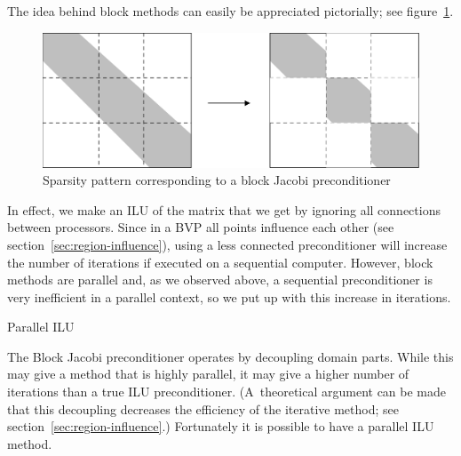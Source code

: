 The idea behind block methods can easily be appreciated pictorially;
see figure~\ref{fig:block-method}.
\begin{figure}[ht]
  \includegraphics[scale=.12]{graphics/block-jacobi}
  \caption{Sparsity pattern corresponding to a block Jacobi
    preconditioner}
  \label{fig:block-method}
\end{figure}
In effect, we make an \ac{ILU} of the matrix that we get by ignoring
all connections between processors. Since in a \ac{BVP} all points
influence each other (see section~\ref{sec:region-influence}), using a
less connected preconditioner will increase the number of iterations
if executed on a sequential computer. However, block methods are
parallel and, as we observed above, a sequential preconditioner is
very inefficient in a parallel context, so we put up with this
increase in iterations.


 {Parallel ILU}
\label{sec:parallel-ilu}

The Block Jacobi preconditioner operates by decoupling domain
parts. While this may give a method that is highly parallel, it may
give a higher number of iterations than a true \ac{ILU}
preconditioner. (A~theoretical argument can be made that this
decoupling decreases the efficiency of the iterative method; see
section~\ref{sec:region-influence}.) Fortunately it is possible to
have a parallel \ac{ILU} method.

